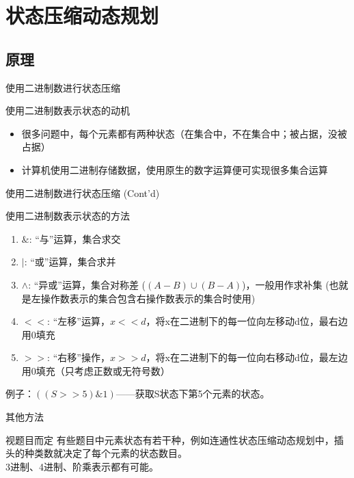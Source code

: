 \documentclass[hyperref={unicode=true}]{beamer}
\theoremstyle{definition}
\theoremstyle{proof}
\begin{document}
\section{状态压缩动态规划}

\subsection{原理}
\begin{frame}{使用二进制数进行状态压缩}
  \begin{block}{使用二进制数表示状态的动机}
    \begin{itemize}
    \item 很多问题中，每个元素都有两种状态（在集合中，不在集合中；被占据，没被占据）
    \item 计算机使用二进制存储数据，使用原生的数字运算便可实现很多集合运算
    \end{itemize}
  \end{block}
\end{frame}

\begin{frame}{使用二进制数进行状态压缩 (Cont'd)}
  \begin{exampleblock}{使用二进制数表示状态的方法}
    \begin{enumerate}
    \item $\&$: “与”运算，集合求交
    \item $|$: “或”运算，集合求并
    \item $\wedge$: “异或”运算，集合对称差 ($(A-B) \cup (B-A)$)，一般用作求补集 (也就是左操作数表示的集合包含右操作数表示的集合时使用)
    \item $<<$: “左移”运算，$x<<d$，将x在二进制下的每一位向左移动d位，最右边用0填充
    \item $>>$: “右移”操作，$x>>d$，将x在二进制下的每一位向右移动d位，最左边用0填充（只考虑正数或无符号数）
    \end{enumerate}
    例子：$((S>>5)\&1)$——获取S状态下第5个元素的状态。
  \end{exampleblock}
\end{frame}
\begin{frame}{其他方法}
  \begin{exampleblock}{视题目而定}
    有些题目中元素状态有若干种，例如连通性状态压缩动态规划中，插头的种类数就决定了每个元素的状态数目。\\
    3进制、4进制、阶乘表示都有可能。
  \end{exampleblock}
\end{frame}
\end{document}
